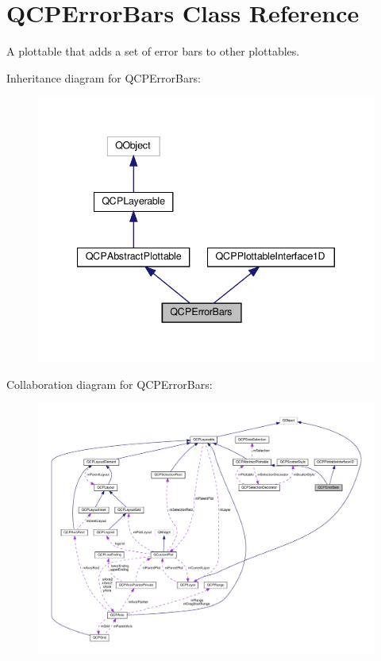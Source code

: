 \hypertarget{classQCPErrorBars}{}\section{Q\+C\+P\+Error\+Bars Class Reference}
\label{classQCPErrorBars}


A plottable that adds a set of error bars to other plottables.  




Inheritance diagram for Q\+C\+P\+Error\+Bars\+:\nopagebreak
\begin{figure}[H]
\begin{center}
\leavevmode
\includegraphics[width=340pt]{classQCPErrorBars__inherit__graph}
\end{center}
\end{figure}


Collaboration diagram for Q\+C\+P\+Error\+Bars\+:\nopagebreak
\begin{figure}[H]
\begin{center}
\leavevmode
\includegraphics[width=350pt]{classQCPErrorBars__coll__graph}
\end{center}
\end{figure}

